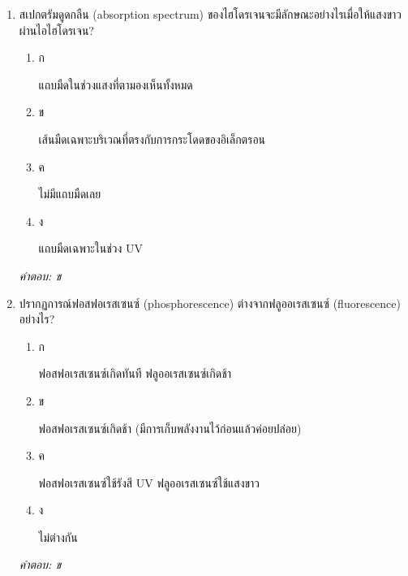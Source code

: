 \documentclass[12pt]{article}
\begin{document}
\begin{enumerate}[label=\arabic*., itemsep=0.5\baselineskip, topsep=0.5\baselineskip, leftmargin=*]
\item สเปกตรัมดูดกลืน (absorption spectrum) ของไฮโดรเจนจะมีลักษณะอย่างไรเมื่อให้แสงขาวผ่านไอไฮโดรเจน?
\begin{enumerate}[label=\alph*)., itemsep=0.3\baselineskip, topsep=0.3\baselineskip]
\item ก\ 
\begin{minipage}[t]{0.9\linewidth}
\raggedright แถบมืดในช่วงแสงที่ตามองเห็นทั้งหมด
\end{minipage}
\item ข\ 
\begin{minipage}[t]{0.9\linewidth}
\raggedright เส้นมืดเฉพาะบริเวณที่ตรงกับการกระโดดของอิเล็กตรอน
\end{minipage}
\item ค\ 
\begin{minipage}[t]{0.9\linewidth}
\raggedright ไม่มีแถบมืดเลย
\end{minipage}
\item ง\ 
\begin{minipage}[t]{0.9\linewidth}
\raggedright แถบมืดเฉพาะในช่วง UV
\end{minipage}
\end{enumerate}
\vspace{-0.3\baselineskip}
\begin{small}
\textit{คำตอบ: ข}
\end{small}

\item ปรากฏการณ์ฟอสฟอเรสเซนซ์ (phosphorescence) ต่างจากฟลูออเรสเซนซ์ (fluorescence) อย่างไร?
\begin{enumerate}[label=\alph*)., itemsep=0.3\baselineskip, topsep=0.3\baselineskip]
\item ก\ 
\begin{minipage}[t]{0.9\linewidth}
\raggedright ฟอสฟอเรสเซนซ์เกิดทันที ฟลูออเรสเซนซ์เกิดช้า
\end{minipage}
\item ข\ 
\begin{minipage}[t]{0.9\linewidth}
\raggedright ฟอสฟอเรสเซนซ์เกิดช้า (มีการเก็บพลังงานไว้ก่อนแล้วค่อยปล่อย)
\end{minipage}
\item ค\ 
\begin{minipage}[t]{0.9\linewidth}
\raggedright ฟอสฟอเรสเซนซ์ใช้รังสี UV ฟลูออเรสเซนซ์ใช้แสงขาว
\end{minipage}
\item ง\ 
\begin{minipage}[t]{0.9\linewidth}
\raggedright ไม่ต่างกัน
\end{minipage}
\end{enumerate}
\vspace{-0.3\baselineskip}
\begin{small}
\textit{คำตอบ: ข}
\end{small}


\end{enumerate}
\end{document}
